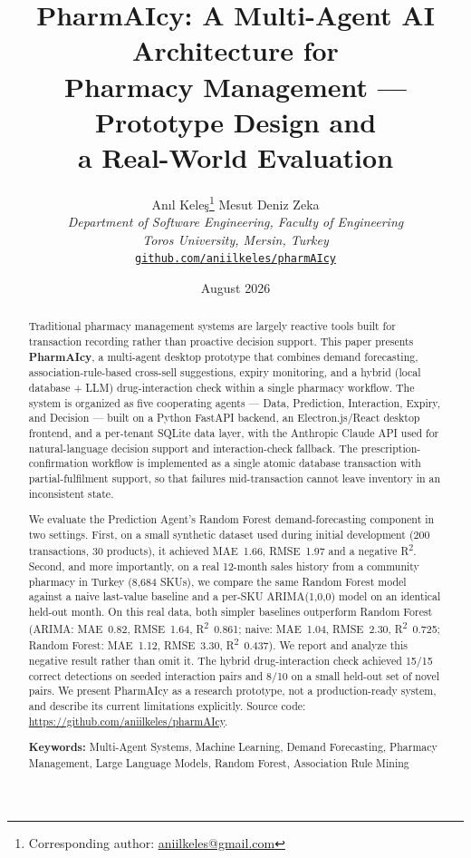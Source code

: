 \documentclass[12pt,a4paper]{article}
\title{%
    \textbf{PharmAIcy: A Multi-Agent AI Architecture for}\\
    \textbf{Pharmacy Management --- Prototype Design and}\\
    \textbf{a Real-World Evaluation}
}
\author{
    An{\i}l Kele\c{s}\thanks{Corresponding author: \href{mailto:aniilkeles@gmail.com}{aniilkeles@gmail.com}} \quad
    Mesut Deniz Zeka \\[4pt]
    \textit{Department of Software Engineering, Faculty of Engineering} \\
    \textit{Toros University, Mersin, Turkey} \\[4pt]
    \href{https://github.com/aniilkeles/pharmAIcy}{\texttt{github.com/aniilkeles/pharmAIcy}}
}
\date{August 2026}
\begin{document}
\maketitle

\begin{abstract}
Traditional pharmacy management systems are largely reactive tools built for transaction recording rather than proactive decision support. This paper presents \textbf{PharmAIcy}, a multi-agent desktop prototype that combines demand forecasting, association-rule-based cross-sell suggestions, expiry monitoring, and a hybrid (local database + LLM) drug-interaction check within a single pharmacy workflow. The system is organized as five cooperating agents --- Data, Prediction, Interaction, Expiry, and Decision --- built on a Python FastAPI backend, an Electron.js/React desktop frontend, and a per-tenant SQLite data layer, with the Anthropic Claude API used for natural-language decision support and interaction-check fallback. The prescription-confirmation workflow is implemented as a single atomic database transaction with partial-fulfilment support, so that failures mid-transaction cannot leave inventory in an inconsistent state.

We evaluate the Prediction Agent's Random Forest demand-forecasting component in two settings. First, on a small synthetic dataset used during initial development (200 transactions, 30 products), it achieved MAE~1.66, RMSE~1.97 and a negative R\textsuperscript{2}. Second, and more importantly, on a real 12-month sales history from a community pharmacy in Turkey (8{,}684 SKUs), we compare the same Random Forest model against a naive last-value baseline and a per-SKU ARIMA(1,0,0) model on an identical held-out month. On this real data, both simpler baselines outperform Random Forest (ARIMA: MAE~0.82, RMSE~1.64, R\textsuperscript{2}~0.861; naive: MAE~1.04, RMSE~2.30, R\textsuperscript{2}~0.725; Random Forest: MAE~1.12, RMSE~3.30, R\textsuperscript{2}~0.437). We report and analyze this negative result rather than omit it. The hybrid drug-interaction check achieved 15/15 correct detections on seeded interaction pairs and 8/10 on a small held-out set of novel pairs. We present PharmAIcy as a research prototype, not a production-ready system, and describe its current limitations explicitly. Source code: \url{https://github.com/aniilkeles/pharmAIcy}.

\smallskip
\noindent\textbf{Keywords:} Multi-Agent Systems, Machine Learning, Demand Forecasting, Pharmacy Management, Large Language Models, Random Forest, Association Rule Mining
\end{abstract}
\end{document}
